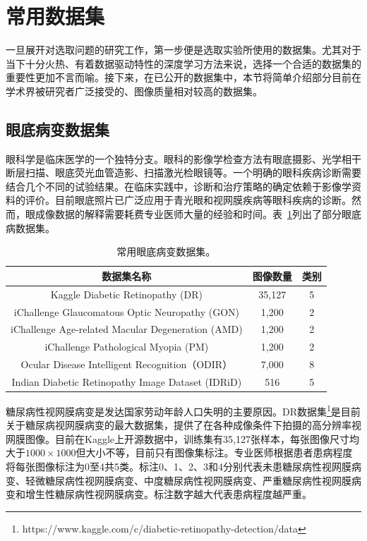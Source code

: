 \section{常用数据集}\label{sec:usually_ds_intro}
一旦展开对选取问题的研究工作，第一步便是选取实验所使用的数据集。尤其对于当下十分火热、有着数据驱动特性的深度学习方法来说，选择一个合适的数据集的重要性更加不言而喻。接下来，在已公开的数据集中，本节将简单介绍部分目前在学术界被研究者广泛接受的、图像质量相对较高的数据集。

\subsection{眼底病变数据集}\label{subsec:original_dr_dataset_intro}
眼科学是临床医学的一个独特分支。眼科的影像学检查方法有眼底摄影、光学相干断层扫描、眼底荧光血管造影、扫描激光检眼镜等。一个明确的眼科疾病诊断需要结合几个不同的试验结果。在临床实践中，诊断和治疗策略的确定依赖于影像学资料的评价。目前眼底照片已广泛应用于青光眼和视网膜疾病等眼科疾病的诊断。然而，眼成像数据的解释需要耗费专业医师大量的经验和时间。表~\ref{tab:datasets_info}列出了部分眼底病数据集。
\begin{table}[h]
	\centering
	\caption[常用眼底病变数据集]{常用眼底病变数据集。}
	\label{tab:datasets_info}
	\begin{tabular}{c|c|c}
		\toprule[2pt]
		数据集名称 & 图像数量 & 类别 \\
		\midrule[2pt]
		Kaggle Diabetic Retinopathy (DR)	& 35,127	& 5	 \\
		\hline                         
		iChallenge Glaucomatous Optic Neuropathy (GON)    & 1,200    & 2 \\ \hline
		iChallenge Age-related Macular Degeneration (AMD) & 1,200    & 2  \\ \hline
		iChallenge Pathological Myopia (PM)               & 1,200    & 2 \\ \hline
		Ocular Disease Intelligent Recognition（ODIR） & 7,000 & 8 \\ \hline
		
		Indian Diabetic Retinopathy Image Dataset (IDRiD) & 516 & 5  \\
		\bottomrule[2pt]
	\end{tabular}
\end{table}

糖尿病性视网膜病变是发达国家劳动年龄人口失明的主要原因。DR数据集\footnote{https://www.kaggle.com/c/diabetic-retinopathy-detection/data}是目前关于糖尿病视网膜病变的最大数据集，提供了在各种成像条件下拍摄的高分辨率视网膜图像。目前在Kaggle上开源数据中，训练集有35,127张样本，每张图像尺寸均大于$1000\times 1000$但大小不等，目前只有图像集标注。专业医师根据患者患病程度将每张图像标注为0至4共5类。标注0、1、2、3和4分别代表未患糖尿病性视网膜病变、轻微糖尿病性视网膜病变、中度糖尿病性视网膜病变、严重糖尿病性视网膜病变和增生性糖尿病性视网膜病变。标注数字越大代表患病程度越严重。

